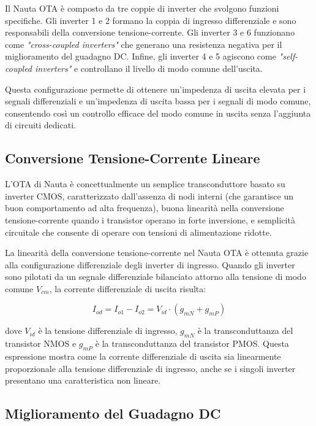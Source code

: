 Il Nauta OTA è composto da tre coppie di inverter che svolgono funzioni specifiche. Gli inverter 1 e 2 formano la coppia di ingresso differenziale e sono responsabili della conversione tensione-corrente. Gli inverter 3 e 6 funzionano come \textit{"cross-coupled inverters"} che generano una resistenza negativa per il miglioramento del guadagno DC. Infine, gli inverter 4 e 5 agiscono come \textit{"self-coupled inverters"} e controllano il livello di modo comune dell'uscita.

Questa configurazione permette di ottenere un'impedenza di uscita elevata per i segnali differenziali e un'impedenza di uscita bassa per i segnali di modo comune, consentendo così un controllo efficace del modo comune in uscita senza l'aggiunta di circuiti dedicati.

\subsection{Conversione Tensione-Corrente Lineare}

L'OTA di Nauta è concettualmente un semplice transconduttore basato su inverter CMOS, caratterizzato dall'assenza di nodi interni (che garantisce un buon comportamento ad alta frequenza), buona linearità nella conversione tensione-corrente quando i transistor operano in forte inversione, e semplicità circuitale che consente di operare con tensioni di alimentazione ridotte.

La linearità della conversione tensione-corrente nel Nauta OTA è ottenuta grazie alla configurazione differenziale degli inverter di ingresso. Quando gli inverter sono pilotati da un segnale differenziale bilanciato attorno alla tensione di modo comune $V_{cm}$, la corrente differenziale di uscita risulta:

\begin{equation}
I_{od} = I_{o1} - I_{o2} = V_{id} \cdot (g_{mN} + g_{mP})
\end{equation}

dove $V_{id}$ è la tensione differenziale di ingresso, $g_{mN}$ è la transconduttanza del transistor NMOS e $g_{mP}$ è la transconduttanza del transistor PMOS. Questa espressione mostra come la corrente differenziale di uscita sia linearmente proporzionale alla tensione differenziale di ingresso, anche se i singoli inverter presentano una caratteristica non lineare.

\subsection{Miglioramento del Guadagno DC}

